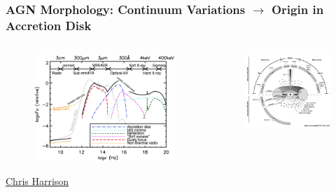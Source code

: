 \documentclass[hyperref={pdfpagelabels=false}]{beamer}
\begin{document}
\begin{frame}
\frametitle{AGN Morphology: Continuum Variations $\rightarrow$ Origin in Accretion Disk}
  \begin{columns}
  \centering
    \begin{column}{0.5\textwidth}
      \begin{figure}
        \includegraphics[scale=0.1]{images/agn_sed.jpg}
      \end{figure}
      \begin{center}
        \href{http://astro.dur.ac.uk/~cpnc25/research.html}{{\tiny Chris Harrison}}
      \end{center}
    \end{column}
    \begin{column}{0.5\textwidth}
      \begin{figure}
        \includegraphics[scale=0.25]{images/AGNModel.jpg}

\end{figure}
\end{column}
\end{columns}
\end{frame}
\end{document}
